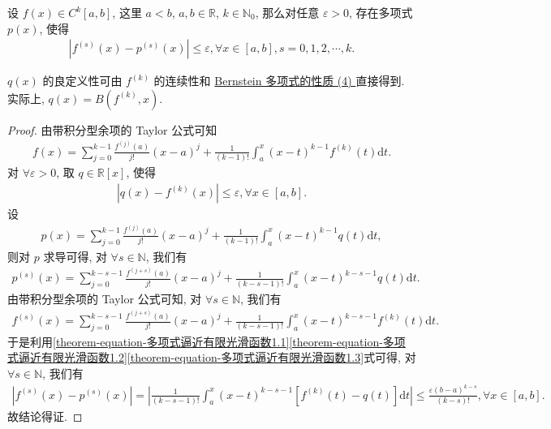 \documentclass[../../main.tex]{subfiles}%
\begin{document}
\begin{theorem}[Weierstrass逼近定理]\label{theorem:多项式逼近有限阶光滑函数-Weierstrass逼近定理}
设 $f(x) \in C^{k}[a,b]$, 这里 $a < b$, $a,b \in \mathbb{R}$, $k \in \mathbb{N}_0$, 那么对任意 $\varepsilon > 0$, 存在多项式 $p(x)$, 使得
\begin{align*}
\left| f^{(s)}(x) - p^{(s)}(x) \right| \leqslant \varepsilon, \forall x \in [a,b], s = 0,1,2,\cdots,k.
\end{align*}
\end{theorem}
\begin{remark}
$q(x)$ 的良定义性可由 $f^{(k)}$ 的连续性和 \hyperref[theorem:Bernstein多项式的性质]{Bernstein 多项式的性质 (4) }直接得到. 实际上, $q(x) = B(f^{(k)},x)$.
\end{remark}
\begin{proof}
由带积分型余项的 Taylor 公式可知
\begin{align*}
f(x) = \sum_{j = 0}^{k - 1} \frac{f^{(j)}(a)}{j!}(x - a)^j + \frac{1}{(k - 1)!} \int_a^x (x - t)^{k - 1} f^{(k)}(t) \mathrm{d}t.
\end{align*}
对 $\forall \varepsilon > 0$, 取 $q \in \mathbb{R}[x]$, 使得
\begin{align}
|q(x) - f^{(k)}(x)| \leqslant \varepsilon, \forall x \in [a,b]. \label{theorem-equation-多项式逼近有限光滑函数1.1}
\end{align}
设
\begin{align*}
p(x) = \sum_{j = 0}^{k - 1} \frac{f^{(j)}(a)}{j!}(x - a)^j + \frac{1}{(k - 1)!} \int_a^x (x - t)^{k - 1} q(t) \mathrm{d}t,
\end{align*}
则对 $p$ 求导可得, 对 $\forall s \in \mathbb{N}$, 我们有
\begin{align}
p^{(s)}(x) = \sum_{j = 0}^{k - s - 1} \frac{f^{(j + s)}(a)}{j!}(x - a)^j + \frac{1}{(k - s - 1)!} \int_a^x (x - t)^{k - s - 1} q(t) \mathrm{d}t. \label{theorem-equation-多项式逼近有限光滑函数1.2}
\end{align}
由带积分型余项的 Taylor 公式可知, 对 $\forall s \in \mathbb{N}$, 我们有
\begin{align}
f^{(s)}(x) = \sum_{j = 0}^{k - s - 1} \frac{f^{(j + s)}(a)}{j!}(x - a)^j + \frac{1}{(k - s - 1)!} \int_a^x (x - t)^{k - s - 1} f^{(k)}(t) \mathrm{d}t.\label{theorem-equation-多项式逼近有限光滑函数1.3}
\end{align}
于是利用\eqref{theorem-equation-多项式逼近有限光滑函数1.1}\eqref{theorem-equation-多项式逼近有限光滑函数1.2}\eqref{theorem-equation-多项式逼近有限光滑函数1.3}式可得, 对 $\forall s \in \mathbb{N}$, 我们有
\begin{align*}
|f^{(s)}(x) - p^{(s)}(x)| = \left| \frac{1}{(k - s - 1)!} \int_a^x (x - t)^{k - s - 1} [f^{(k)}(t) - q(t)] \mathrm{d}t \right| \leqslant \frac{\varepsilon (b - a)^{k - s}}{(k - s)!}, \forall x \in [a,b].
\end{align*}
故结论得证.
\end{proof}
\end{document}
